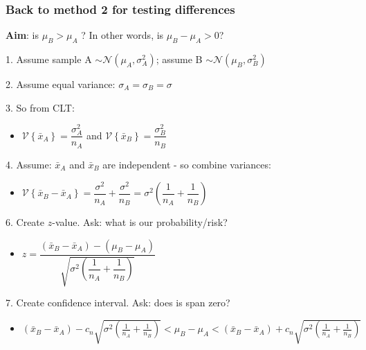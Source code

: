 \begin{frame}\frametitle{Back to method 2 for testing differences}

	\textbf{Aim}: is $\mu_B > \mu_A$ ? In other words, is $\mu_B - \mu_A > 0$?

	1. Assume sample A $\sim \mathcal{N}\left(\mu_A, \sigma^2_A\right)$; assume B $\sim \mathcal{N}\left(\mu_B, \sigma^2_B\right)$

	2. Assume equal variance: $\sigma_A = \sigma_B = \sigma$

	3. So from CLT:
	\begin{itemize}
		\item	$\mathcal{V}\left\{\bar{x}_A\right\} = \dfrac{\sigma^2_A}{n_A}$ and $\mathcal{V}\left\{\bar{x}_B\right\} = \dfrac{\sigma^2_B}{n_B}$
	\end{itemize}

	4. Assume: $\bar{x}_A$ and $\bar{x}_B$ are independent - so combine variances:
	\begin{itemize}
		\item	$\mathcal{V}\left\{\bar{x}_B - \bar{x}_A\right\} = \dfrac{\sigma^2}{n_A} + \dfrac{\sigma^2}{n_B} = \sigma^2 \left(\dfrac{1}{n_A} + \dfrac{1}{n_B}\right)$
	\end{itemize}

	6. Create $z$-value. Ask: what is our probability/risk?
	\begin{itemize}
		\item$z = \dfrac{(\bar{x}_B - \bar{x}_A) - (\mu_B - \mu_A)}{\sqrt{\sigma^2 \left(\dfrac{1}{n_A} + \dfrac{1}{n_B}\right)}}$
	\end{itemize}

	7. Create confidence interval. Ask: does is span zero?
	\begin{itemize}
		\item$(\bar{x}_B - \bar{x}_A) - c_n \sqrt{\sigma^2 (\tfrac{1}{n_A} + \tfrac{1}{n_B})} < \mu_B - \mu_A < (\bar{x}_B - \bar{x}_A) + c_n \sqrt{\sigma^2 (\tfrac{1}{n_A} + \tfrac{1}{n_B})}$
	\end{itemize}
\end{frame}

